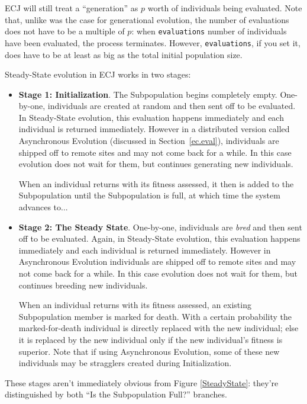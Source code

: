 \documentclass[twoside,10pt]{book}
\newcommand\parameter[1]{\index{#1}\texttt{#1}}
\begin{document}
ECJ will still treat a ``generation'' as \(p\) worth of individuals being evaluated.  Note that, unlike was the case for generational evolution, the number of evaluations does not have to be a multiple of \(p\): when \parameter{evaluations} number of individuals have been evaluated, the process terminates.  However, \parameter{evaluations}, if you set it, does have to be at least as big as the total initial population size.


Steady-State evolution in ECJ works in two stages:

\begin{itemize}
\item {\bf Stage 1: Initialization}.  The Subpopulation begins completely empty.  One-by-one, individuals are created at random and then sent off to be evaluated.  In Steady-State evolution, this evaluation happens immediately and each individual is returned immediately.  However in a distributed version called Asynchronous Evolution (discussed in Section~\ref{ec.eval}), individuals are shipped off to remote sites and may not come back for a while.  In this case evolution does not wait for them, but continues generating new individuals.

When an individual returns with its fitness assessed, it then is added to the Subpopulation until the Subpopulation is full, at which time the system advances to...

\item {\bf Stage 2: The Steady State}.  One-by-one, individuals are {\it bred} and then sent off to be evaluated.  Again, in Steady-State evolution, this evaluation happens immediately and each individual is returned immediately.  However in Asynchronous Evolution individuals are shipped off to remote sites and may not come back for a while.  In this case evolution does not wait for them, but continues breeding new individuals.

When an individual returns with its fitness assessed, an existing Subpopulation member is marked for death.  With a certain probability the marked-for-death individual is directly replaced with the new individual; else it is replaced by the new individual only if the new individual's fitness is superior.  Note that if using Asynchronous Evolution, some of these new individuals may be stragglers created during Initialization.
\end{itemize}

These stages aren't immediately obvious from Figure \ref{SteadyState}: they're distinguished by both ``Is the Subpopulation Full?'' branches.
\end{document}
